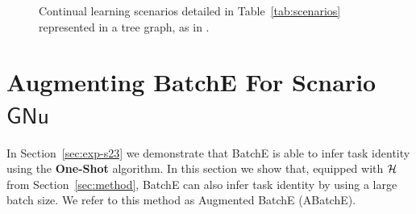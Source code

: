 \documentclass{article}
\newcommand{\casename}[1]{\ensuremath{\mathsf{#1}}\xspace}
\begin{document}
\begin{figure}
\begin{minipage}{.4\textwidth}
\caption{Continual learning scenarios detailed in Table~\ref{tab:scenarios} represented in a tree graph, as in \cite{zeno2018task}.}
\label{fig:scenarios}
\end{minipage}
\end{figure}

\section{Augmenting BatchE For Scnario \casename{GNu}} \label{sec:better-baseline}

In Section~\ref{sec:exp-s23} we demonstrate that BatchE \cite{wen2020batchensemble} is able to infer task identity using the \textbf{One-Shot} algorithm. In this section we show that, equipped with $\mathcal{H}$ from Section~\ref{sec:method}, BatchE can also infer task identity by using a large batch size. We refer to this method as Augmented BatchE (ABatchE).
\end{document}
